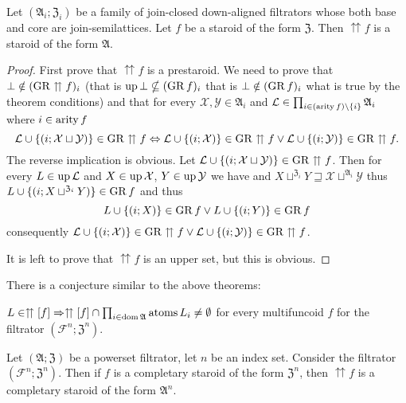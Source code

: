 \begin{thm}
\label{upg-is-strd}Let $(\mathfrak{A}_{i};\mathfrak{Z}_{i})$ be
a family of join-closed down-aligned filtrators whose both base and
core are join-semilattices. Let $f$ be a staroid of the form $\mathfrak{Z}$.
Then $\upuparrows f$ is a staroid of the form $\mathfrak{A}$.\end{thm}
\begin{proof}
First prove that $\upuparrows f$ is a prestaroid. We need to prove
that $\bot\notin(\operatorname{GR}\upuparrows f)_{i}$ (that is $\operatorname{up}\bot\nsubseteq(\operatorname{GR} f)_{i}$
that is $\bot\notin(\operatorname{GR} f)_{i}$ what is true by the theorem conditions)
and that for every $\mathcal{X},\mathcal{Y}\in\mathfrak{A}_{i}$ and
$\mathcal{L}\in\prod_{i\in(\operatorname{arity} f)\setminus\{i\}}\mathfrak{A}_{i}$
where $i\in\operatorname{arity} f$
\[
\mathcal{L}\cup\{(i;\mathcal{X}\sqcup\mathcal{Y})\}\in\operatorname{GR}\upuparrows f\Leftrightarrow\mathcal{L}\cup\{(i;\mathcal{X})\}\in\operatorname{GR}\upuparrows f\vee\mathcal{L}\cup\{(i;\mathcal{Y})\}\in\operatorname{GR}\upuparrows f.
\]
The reverse implication is obvious. Let $\mathcal{L}\cup\{(i;\mathcal{X}\sqcup\mathcal{Y})\}\in\operatorname{GR}\upuparrows f$.
Then for every $L\in\operatorname{up}\mathcal{L}$ and $X\in\operatorname{up}\mathcal{X}$, $Y\in\operatorname{up}\mathcal{Y}$
we have and $X\sqcup^{\mathfrak{Z}_{i}}Y\sqsupseteq\mathcal{X}\sqcup^{\mathfrak{A}_{i}}\mathcal{Y}$
thus $L\cup\{(i;X\sqcup^{\mathfrak{Z}_{i}}Y)\}\in\operatorname{GR} f$ and thus
\[
L\cup\{(i;X)\}\in\operatorname{GR} f\vee L\cup\{(i;Y)\}\in\operatorname{GR} f
\]
consequently $\mathcal{L}\cup\{(i;\mathcal{X})\}\in\operatorname{GR}\upuparrows f\vee\mathcal{L}\cup\{(i;\mathcal{Y})\}\in\operatorname{GR}\upuparrows f$.

It is left to prove that $\upuparrows f$ is an upper set, but this
is obvious.
\end{proof}
There is a conjecture similar to the above theorems:
\begin{conjecture}
\label{strd-rel-atoms}$L\in\upuparrows\mathord{\mathrel{\left[f\right]}}\Rightarrow\upuparrows\mathord{\mathrel{\left[f\right]}}\cap\prod_{i\in\operatorname{dom}\mathfrak{A}}\operatorname{atoms} L_{i}\neq\emptyset$
for every multifuncoid $f$ for the filtrator $(\mathscr{F}^{n};\mathfrak{Z}^{n})$.
\end{conjecture}

\begin{conjecture}
Let $(\mathfrak{A};\mathfrak{Z})$ be a powerset filtrator, let $n$
be an index set. Consider the filtrator $(\mathscr{F}^{n};\mathfrak{Z}^{n})$.
Then if $f$ is a completary staroid of the form $\mathfrak{Z}^{n}$,
then $\upuparrows f$ is a completary staroid of the form $\mathfrak{A}^{n}$.
\end{conjecture}

